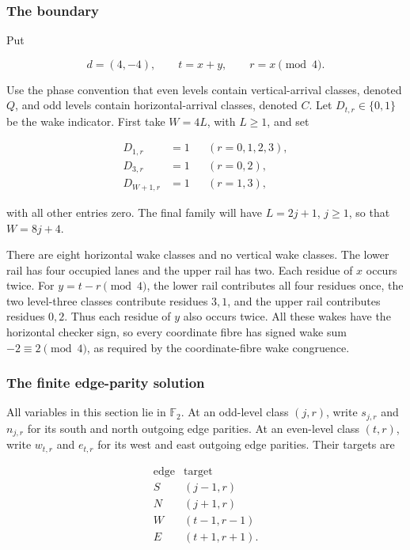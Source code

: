 \documentclass[11pt,letterpaper]{article}
\theoremstyle{plain}
\theoremstyle{definition}
\begin{document}
\begin{NoHyper}
\subsubsection{The boundary}

Put

\[
d=(4,-4),\qquad t=x+y,\qquad r=x\pmod4.
\]

Use the phase convention that even levels contain vertical-arrival classes, denoted \(Q\), and odd levels contain horizontal-arrival classes, denoted \(C\). Let \(D_{t,r}\in\{0,1\}\) be the wake indicator. First take \(W=4L\), with \(L\ge1\), and set

\[
\begin{aligned}
D_{1,r}&=1 &&(r=0,1,2,3),\\
D_{3,r}&=1 &&(r=0,2),\\
D_{W+1,r}&=1 &&(r=1,3),
\end{aligned}
\]

with all other entries zero. The final family will have \(L=2j+1\), \(j\ge1\), so that \(W=8j+4\).

There are eight horizontal wake classes and no vertical wake classes. The lower rail has four occupied lanes and the upper rail has two. Each residue of \(x\) occurs twice. For \(y=t-r\pmod4\), the lower rail contributes all four residues once, the two level-three classes contribute residues \(3,1\), and the upper rail contributes residues \(0,2\). Thus each residue of \(y\) also occurs twice. All these wakes have the horizontal checker sign, so every coordinate fibre has signed wake sum \(-2\equiv2\pmod4\), as required by the coordinate-fibre wake congruence.

\subsubsection{The finite edge-parity solution}

All variables in this section lie in \(\mathbb F_2\). At an odd-level class \((j,r)\), write \(s_{j,r}\) and \(n_{j,r}\) for its south and north outgoing edge parities. At an even-level class \((t,r)\), write \(w_{t,r}\) and \(e_{t,r}\) for its west and east outgoing edge parities. Their targets are

\[
\begin{array}{c|c}
\text{edge}&\text{target}\\ \hline
S&(j-1,r)\\
N&(j+1,r)\\
W&(t-1,r-1)\\
E&(t+1,r+1).
\end{array}
\]


\end{NoHyper}
\end{document}

